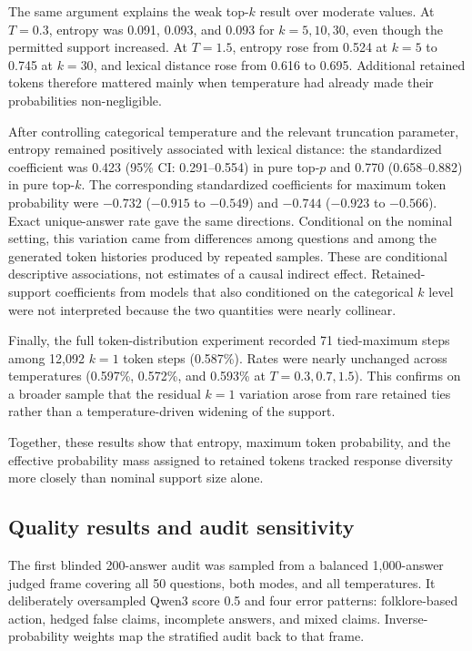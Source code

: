 \documentclass[11pt]{article}
\begin{document}
The same argument explains the weak top-$k$ result over moderate values. At
$T=0.3$, entropy was 0.091, 0.093, and 0.093 for $k=5,10,30$, even though the
permitted support increased. At $T=1.5$, entropy rose from 0.524 at $k=5$ to
0.745 at $k=30$, and lexical distance rose from 0.616 to 0.695. Additional
retained tokens therefore mattered mainly when temperature had already made
their probabilities non-negligible.

After controlling categorical temperature and the relevant truncation
parameter, entropy remained positively associated with lexical distance: the
standardized coefficient was 0.423 (95\% CI: 0.291--0.554) in pure top-$p$ and
0.770 (0.658--0.882) in pure top-$k$. The corresponding standardized
coefficients for maximum token probability were $-0.732$
($-0.915$ to $-0.549$) and $-0.744$ ($-0.923$ to $-0.566$). Exact unique-answer
rate gave the same directions. Conditional on the nominal setting, this
variation came from differences among questions and among the generated token
histories produced by repeated samples. These are conditional descriptive associations,
not estimates of a causal indirect effect. Retained-support coefficients from
models that also conditioned on the categorical $k$ level were not interpreted
because the two quantities were nearly collinear.

Finally, the full token-distribution experiment recorded 71 tied-maximum steps among 12,092
$k=1$ token steps (0.587\%). Rates were nearly unchanged across temperatures
(0.597\%, 0.572\%, and 0.593\% at $T=0.3,0.7,1.5$). This confirms on a broader
sample that the residual $k=1$ variation arose from rare retained ties rather
than a temperature-driven widening of the support.

Together, these results show that entropy, maximum token probability, and the
effective probability mass assigned to retained tokens tracked response
diversity more closely than nominal support size alone.

\subsection{Quality results and audit sensitivity}

The first blinded 200-answer audit was sampled from a balanced 1,000-answer
judged frame covering all 50 questions, both modes, and all temperatures. It
deliberately oversampled Qwen3 score 0.5 and four error patterns: folklore-based
action, hedged false claims, incomplete answers, and mixed claims.
Inverse-probability weights map the stratified audit back to that frame.
\end{document}
